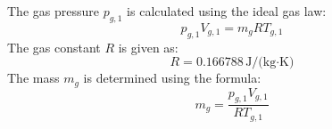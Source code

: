 The gas pressure \( p_{g,1} \) is calculated using the ideal gas law:  
\[
p_{g,1} V_{g,1} = m_g R T_{g,1}
\]  
The gas constant \( R \) is given as:  
\[
R = 0.166788 \, \text{J/(kg·K)}
\]  
The mass \( m_g \) is determined using the formula:  
\[
m_g = \frac{p_{g,1} V_{g,1}}{R T_{g,1}}
\]